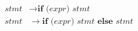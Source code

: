 
\begin{align}
\textit{stmt} &\rightarrow \textbf{if } \textbf{(}\textit{expr}\textbf{) } \textit{stmt} \nonumber \\
\textit{stmt} &\rightarrow \textbf{if } \textbf{(}\textit{expr}\textbf{) } stmt \textbf{ else } \textit{stmt} \nonumber
\end{align}
